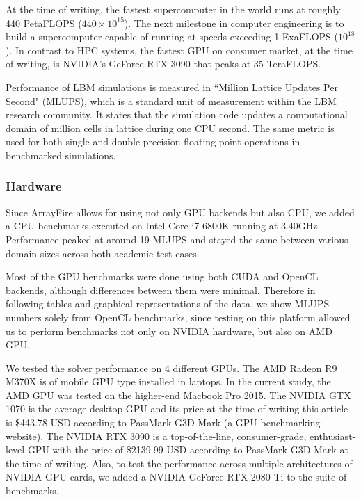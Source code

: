 At the time of writing, the fastest supercomputer in the world runs at roughly 440 PetaFLOPS ($440\times10^{15}$). The next milestone in computer engineering is to build a supercomputer capable of running at speeds exceeding 1 ExaFLOPS ($10^{18}$). In contrast to HPC systems, the fastest GPU on consumer market, at the time of writing, is NVIDIA's GeForce RTX 3090 that peaks at 35 TeraFLOPS.

Performance of LBM simulations is measured in ``Million Lattice Updates Per Second" (MLUPS), which is a standard unit of measurement within the LBM research community. It states that the simulation code updates a computational domain of million cells in lattice during one CPU second. The same metric is used for both single and double-precision floating-point operations in benchmarked simulations. 

\subsubsection{Hardware}\label{sec:hardware-gpus}
Since ArrayFire allows for using not only GPU backends but also CPU, we added a CPU benchmarks executed on Intel Core i7 6800K running at 3.40GHz. Performance peaked at around 19 MLUPS and stayed the same between various domain sizes across both academic test cases.

Most of the GPU benchmarks were done using both CUDA and OpenCL backends, although differences between them were minimal. Therefore in following tables and graphical representations of the data, we show MLUPS numbers solely from OpenCL benchmarks, since testing on this platform allowed us to perform benchmarks not only on NVIDIA hardware, but also on AMD GPU.

We tested the solver performance on 4 different GPUs. The AMD Radeon R9 M370X is of mobile GPU type installed in laptops. In the current study, the AMD GPU was tested on the higher-end Macbook Pro 2015. The NVIDIA GTX 1070 is the average desktop GPU and its price at the time of writing this article is \$443.78 USD according to PassMark G3D Mark (a GPU benchmarking website). The NVIDIA RTX 3090 is a top-of-the-line, consumer-grade, enthusiast-level GPU with the price of \$2139.99 USD according to PassMark G3D Mark at the time of writing. Also, to test the performance across multiple architectures of NVIDIA GPU cards, we added a NVIDIA GeForce RTX 2080 Ti to the suite of benchmarks.

